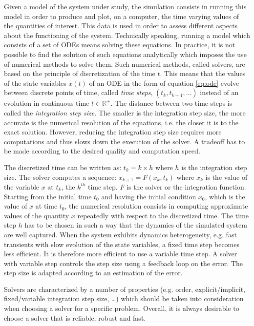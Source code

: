Given a model of the system under study, the simulation consists in running this model in order to produce and plot, on a computer, the time varying values of the quantities of interest. This data is used in order to assess different aspects about the functioning of the system. Technically speaking, running a model which consists of a set of ODEs means solving these equations. In practice, it is not possible to find the solution of such equations analytically which imposes the use of numerical methods to solve them. Such numerical methods, called solvers, are based on the principle of discretization of the time $t$. This means that the values of the state variables $x(t)$ of an ODE in the form of equation \ref{eq:ode} evolve between discrete points of time, called \textit{time steps}, $(t_k, t_{k+1}, \ldots)$ instead of an evolution in continuous time $t \in \mathbb{R}^+$. The distance between two time steps is called the \textit{integration step size}. The smaller is the integration step size, the more accurate is the numerical resolution of the equations, i.e. the closer it is to the exact solution. However, reducing the integration step size requires more computations and thus slows down the execution of the solver. A tradeoff has to be made according to the desired quality and computation speed.

The discretized time can be written as: $t_k = k \times h$ where $h$ is the integration step size. The solver computes a sequence: $x_{k+1} = F(x_k,t_k)$ where $x_k$ is the value of the variable $x$ at $t_k$, the $k^{th}$ time step. $F$ is the solver or the integration function. Starting from the initial time $t_0$ and having the initial condition $x_0$, which is the value of $x$ at time $t_0$, the numerical resolution consists in computing approximate values of the quantity $x$ repeatedly with respect to the discretized time. The time step $h$ has to be chosen in such a way that the dynamics of the simulated system are well captured. When the system exhibits dynamics heterogeneity, e.g. fast transients with slow evolution of the state variables, a fixed time step becomes less efficient. It is therefore  more efficient to use a variable time step. A solver with variable step controls the step size using a feedback loop on the error. The step size is adapted according to an estimation of the error. 

Solvers are characterized by a number of properties (e.g. order, explicit/implicit, fixed/variable integration step size, \ldots) which should be taken into consideration when choosing a solver for a specific problem. Overall, it is always desirable to choose a solver that is reliable, robust and fast.


